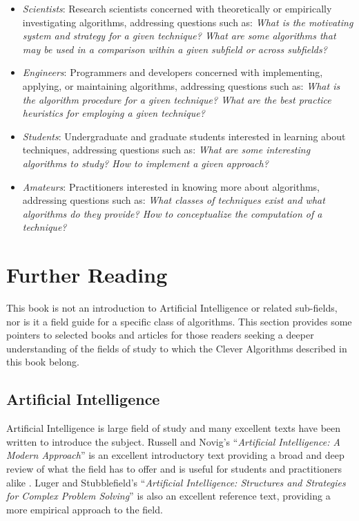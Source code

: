 \begin{bibunit}
\begin{itemize}
	\item \emph{Scientists}: Research scientists concerned with theoretically or empirically investigating algorithms, addressing questions such as: \emph{What is the motivating system and strategy for a given technique? What are some algorithms that may be used in a comparison within a given subfield or across subfields?}
	\item \emph{Engineers}: Programmers and developers concerned with implementing, applying, or maintaining algorithms, addressing questions such as: \emph{What is the algorithm procedure for a given technique? What are the best practice heuristics for employing a given technique?}
	\item \emph{Students}: Undergraduate and graduate students interested in learning about techniques, addressing questions such as: \emph{What are some interesting algorithms to study? How to implement a given approach?}
	\item \emph{Amateurs}: Practitioners interested in knowing more about algorithms, addressing questions such as: \emph{What classes of techniques exist and what algorithms do they provide? How to conceptualize the computation of a technique?}
\end{itemize}

% 
% 
\section{Further Reading}
\label{intro:sec:further_reading}
This book is not an introduction to Artificial Intelligence or related sub-fields, nor is it a field guide for a specific class of algorithms. This section provides some pointers to selected books and articles for those readers seeking a deeper understanding of the fields of study to which the Clever Algorithms described in this book belong.

% 
% 
\subsection{Artificial Intelligence}
Artificial Intelligence is large field of study and many excellent texts have been written to introduce the subject. Russell and Novig's ``\emph{Artificial Intelligence: A Modern Approach}'' is an excellent introductory text providing a broad and deep review of what the field has to offer and is useful for students and practitioners alike \cite{Russell2009}. Luger and Stubblefield's ``\emph{Artificial Intelligence: Structures and Strategies for Complex Problem Solving}'' is also an excellent reference text, providing a more empirical approach to the field.


\end{bibunit}

